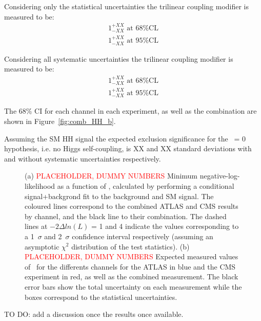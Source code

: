 Considering only the statistical uncertainties the trilinear coupling modifier is measured to be:
\[
\begin{split}
1^{+XX}_{-XX} \text{ at 68\% CL} \\
1^{+XX}_{-XX} \text{ at 95\% CL}
\end{split}
\]

Considering all systematic uncertainties the trilinear coupling modifier is measured to be:
\[
\begin{split}
1^{+XX}_{-XX} \text{ at 68\% CL} \\
1^{+XX}_{-XX} \text{ at 95\% CL}
\end{split}
\]

The 68\% CI for each channel in each experiment, as well as the combination are shown in Figure~\ref{fig:comb_HH_b}.

Assuming the SM HH signal the expected exclusion significance for the \kl\ = 0 hypothesis, i.e. no Higgs self-coupling, is XX and XX standard deviations with and without systematic uncertainties respectively.









\begin{figure}[!htb]
\centering 
{} 
\caption{(a) \textcolor{red}{PLACEHOLDER, DUMMY NUMBERS} Minimum negative-log-likelihood as a function of \kl, calculated by performing a conditional signal+backgrond fit to the background and SM signal. The coloured lines correspond to the combined ATLAS and CMS results by channel, and the black line to their combination. The dashed lines at $-2\Delta ln(L)$ = 1 and 4 indicate the values corresponding to a 1~$\sigma$ and 2~$\sigma$ confidence interval respectively (assuming an asymptotic $\chi^{2}$ distribution of the test statistics). (b) \textcolor{red}{PLACEHOLDER, DUMMY NUMBERS} Expected measured values of \kl\ for the differents channels for the ATLAS in blue and the CMS experiment in red, as well as the combined measurement. The black error bars show the total uncertainty on each measurement while the boxes correspond to the statistical uncertainties.} 
\label{fig:comb_HH} 
\end{figure}

TO DO: add a discussion once the results once available.
